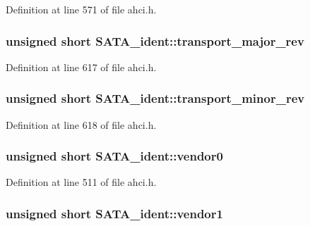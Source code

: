 Definition at line 571 of file ahci.\+h.

\subsubsection[{\texorpdfstring{transport\+\_\+major\+\_\+rev}{transport_major_rev}}]{\setlength{\rightskip}{0pt plus 5cm}unsigned short S\+A\+T\+A\+\_\+ident\+::transport\+\_\+major\+\_\+rev}\hypertarget{structSATA__ident_ae04d840fdf1a87cc832b491a0e02ee0c}{}\label{structSATA__ident_ae04d840fdf1a87cc832b491a0e02ee0c}


Definition at line 617 of file ahci.\+h.

\subsubsection[{\texorpdfstring{transport\+\_\+minor\+\_\+rev}{transport_minor_rev}}]{\setlength{\rightskip}{0pt plus 5cm}unsigned short S\+A\+T\+A\+\_\+ident\+::transport\+\_\+minor\+\_\+rev}\hypertarget{structSATA__ident_a582e9c9d3e52b0f84a4b311c48aaa2b5}{}\label{structSATA__ident_a582e9c9d3e52b0f84a4b311c48aaa2b5}


Definition at line 618 of file ahci.\+h.

\subsubsection[{\texorpdfstring{vendor0}{vendor0}}]{\setlength{\rightskip}{0pt plus 5cm}unsigned short S\+A\+T\+A\+\_\+ident\+::vendor0}\hypertarget{structSATA__ident_a59ae424a72fd8d4ccb2eec8b94f97dd1}{}\label{structSATA__ident_a59ae424a72fd8d4ccb2eec8b94f97dd1}


Definition at line 511 of file ahci.\+h.

\subsubsection[{\texorpdfstring{vendor1}{vendor1}}]{\setlength{\rightskip}{0pt plus 5cm}unsigned short S\+A\+T\+A\+\_\+ident\+::vendor1}\hypertarget{structSATA__ident_a57a0bd1026214ec3cad61717fea08ee9}{}\label{structSATA__ident_a57a0bd1026214ec3cad61717fea08ee9}


